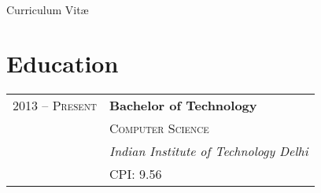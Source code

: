 \documentclass[10pt]{article} %
\begin{document}
\color{text1} %


\par{\\ %
{\color{headings} Curriculum {Vit\ae}\\[15pt]\par} %
	

\begin{minipage}[t]{0.5\textwidth} %
\vspace{0pt} %



\section{Education} 

\begin{tabular}{rl} %


2013 -- \textsc{Present} & \textbf{Bachelor of Technology} \\ 
& \textsc{Computer Science} \\ 
& \textit{Indian Institute of Technology Delhi}\\
& CPI: 9.56

\end{tabular}\\[10pt]



\end{minipage}}
\end{document}
